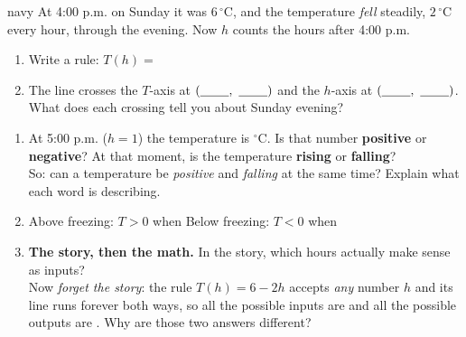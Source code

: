 \documentclass[12pt]{article}
\newcommand{\answerspace}[2]{\par\nopagebreak\noindent\begin{minipage}[t][#1][t]{\linewidth}%
  \color{keyred}\bfseries #2\end{minipage}\par}
\newcommand{\tempgrid}{%
  \draw[step=1, linegray!40, very thin] (0,-8) grid (7,8);
  \draw[->, semithick, charcoal] (0,0)--(7.6,0) node[right, font=\scriptsize]{$h$};
  \draw[->, semithick, charcoal] (0,-8.6)--(0,8.8) node[above, font=\scriptsize]{$T$ ($^\circ$C)};
  \foreach \x in {1,...,7} \node[charcoal, font=\tiny, below] at (\x,0){\x};
  \foreach \y in {-8,-6,-4,-2,2,4,6,8} \node[charcoal, font=\tiny, left] at (0,\y){\y};}
\begin{document}
\boxguard[14]
\begin{scenariobox}{navy}
At 4:00 p.m. on Sunday it was $6\,^\circ$C, and the temperature \emph{fell} steadily, $2\,^\circ$C
every hour, through the evening. Now $h$ counts the hours after 4:00 p.m.

\begin{minipage}[t]{0.54\linewidth}
\vspace{0pt}
\begin{enumerate}[label=\textbf{\alph*.}, leftmargin=1.8em, itemsep=5pt]
  \item Write a rule: \; $T(h) = $ \blank{3.0cm}
  \item The line crosses the $T$-axis at $(\blank{0.8cm},\ \blank{0.8cm})$ and the $h$-axis
        at $(\blank{0.8cm},\ \blank{0.8cm})$. What does each crossing tell you about Sunday
        evening?
        \answerspace{2.4cm}{}
\end{enumerate}
\end{minipage}\hfill
\begin{minipage}[t]{0.42\linewidth}
\vspace{0pt}\centering
{}
\end{minipage}

\begin{enumerate}[label=\textbf{\alph*.}, start=3, leftmargin=1.8em, itemsep=5pt]
  \item At 5:00 p.m. ($h=1$) the temperature is \blank{1.2cm} $^\circ$C. Is that number
        \textbf{positive} or \textbf{negative}? At that moment, is the temperature \textbf{rising}
        or \textbf{falling}? \\[4pt]
        So: can a temperature be \emph{positive} and \emph{falling} at the same time? Explain
        what each word is describing.
        \answerspace{2.2cm}{}
  \item Above freezing: $T>0$ when \blank{3.0cm} \qquad
        Below freezing: $T<0$ when \blank{2.6cm}
  \item \textbf{The story, then the math.} In the story, which hours actually make sense as
        inputs? \blank{4.0cm} \\[2pt]
        Now \emph{forget the story}: the rule $T(h) = 6 - 2h$ accepts \emph{any} number $h$ and its
        line runs forever both ways, so all the possible inputs are \blank{2.8cm} and all
        the possible outputs are \blank{2.8cm}. Why are those two answers different?
        \answerspace{1.5cm}{}
\end{enumerate}
\end{scenariobox}
\end{document}
